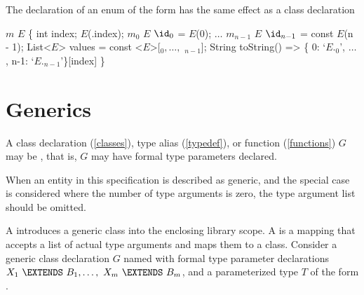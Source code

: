 \documentclass[makeidx]{article}
\begin{document}
\LMHash{}%
The declaration of an enum of the form
has the same effect as a class declaration

\begin{dartCode}
$m$ \CLASS{} $E$ \{
  \FINAL{} int index;
  \CONST{} $E$(\THIS{}.index);
  $m_0$ \STATIC{} \CONST{} $E$ $\id_0$ = \CONST{} $E$(0);
  $\ldots$
  $m_{n-1}$ \STATIC{} \CONST{} $E$ $\id_{n-1}$ = const $E$(n - 1);
  \STATIC{} \CONST{} List<$E$> values = const <$E$>[\id$_0, \ldots, $ \id$_{n-1}$];
  String toString() => \{ 0: `$E$.\id$_0$', $\ldots$, n-1: `$E$.\id$_{n-1}$'\}[index]
\}
\end{dartCode}



\section{Generics}

\LMHash{}%
A class declaration (\ref{classes}), type alias (\ref{typedef}), or function (\ref{functions}) $G$ may be , that is, $G$ may have formal type parameters declared.

\LMHash{}%
When an entity in this specification is described as generic,
and the special case is considered where the number of type arguments is zero,
the type argument list should be omitted.


\LMHash{}%
A 
introduces a generic class into the enclosing library scope.
A 
is a mapping that accepts a list of actual type arguments and maps them to a class.
Consider a generic class declaration $G$ named  with formal type parameter declarations
$X_1\ \EXTENDS\ B_1, \ldots,\ X_m\ \EXTENDS\ B_m$,
and a parameterized type $T$ of the form .
\end{document}
